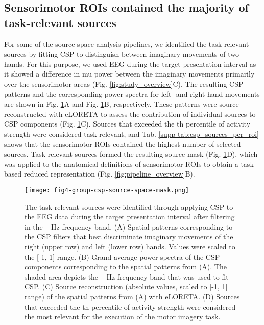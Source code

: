 \subsection{Sensorimotor ROIs contained the majority of task-relevant sources}

For some of the source space analysis pipelines, we identified the task-relevant sources by fitting CSP to distinguish between imaginary movements of two hands. For this purpose, we used EEG during the target presentation interval as it showed a difference in mu power between the imaginary movements primarily over the sensorimotor areas (Fig. \ref{fig:study_overview}C). The resulting CSP patterns and the corresponding power spectra for left- and right-hand movements are shown in Fig. \ref{fig:group_csp_source_space_mask}A and Fig. \ref{fig:group_csp_source_space_mask}B, respectively. These patterns were source reconstructed with eLORETA to assess the contribution of individual sources to CSP components (Fig. \ref{fig:group_csp_source_space_mask}C). Sources that exceeded the \cspSourceThreshold th percentile of activity strength were considered task-relevant, and Tab. \ref{supp-tab:csp_sources_per_roi} shows that the sensorimotor ROIs contained the highest number of selected sources. Task-relevant sources formed the resulting source mask (Fig. \ref{fig:group_csp_source_space_mask}D), which was applied to the anatomical definitions of sensorimotor ROIs to obtain a task-based reduced representation (Fig. \ref{fig:pipeline_overview}B).

\begin{figure}[htbp]
    \centering
    \texttt{[image: fig4-group-csp-source-space-mask.png]}
    \caption{The task-relevant sources were identified through applying CSP to the EEG data during the target presentation interval after filtering in the \muLow-\muHigh~Hz frequency band. (A) Spatial patterns corresponding to the CSP filters that best discriminate imaginary movements of the right (upper row) and left (lower row) hands. Values were scaled to the [-1, 1] range. (B) Grand average power spectra of the CSP components corresponding to the spatial patterns from (A). The shaded area depicts the \muLow-\muHigh~Hz frequency band that was used to fit CSP. (C) Source reconstruction (absolute values, scaled to [-1, 1] range) of the spatial patterns from (A) with eLORETA. (D) Sources that exceeded the \cspSourceThreshold th percentile of activity strength were considered the most relevant for the execution of the motor imagery task.}
    \label{fig:group_csp_source_space_mask}
\end{figure}

